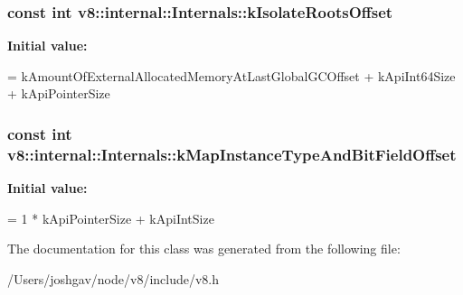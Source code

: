 \subsubsection[{\texorpdfstring{k\+Isolate\+Roots\+Offset}{kIsolateRootsOffset}}]{\setlength{\rightskip}{0pt plus 5cm}const int v8\+::internal\+::\+Internals\+::k\+Isolate\+Roots\+Offset\hspace{0.3cm}{\ttfamily [static]}}\hypertarget{classv8_1_1internal_1_1_internals_a3142f942a25203ce7fca0e9a4563c74d}{}\label{classv8_1_1internal_1_1_internals_a3142f942a25203ce7fca0e9a4563c74d}
{\bfseries Initial value\+:}
\begin{DoxyCode}
=
      kAmountOfExternalAllocatedMemoryAtLastGlobalGCOffset + kApiInt64Size +
      kApiPointerSize
\end{DoxyCode}
\subsubsection[{\texorpdfstring{k\+Map\+Instance\+Type\+And\+Bit\+Field\+Offset}{kMapInstanceTypeAndBitFieldOffset}}]{\setlength{\rightskip}{0pt plus 5cm}const int v8\+::internal\+::\+Internals\+::k\+Map\+Instance\+Type\+And\+Bit\+Field\+Offset\hspace{0.3cm}{\ttfamily [static]}}\hypertarget{classv8_1_1internal_1_1_internals_aeda3ec9bc2906bf6162b9cf3df9fd94a}{}\label{classv8_1_1internal_1_1_internals_aeda3ec9bc2906bf6162b9cf3df9fd94a}
{\bfseries Initial value\+:}
\begin{DoxyCode}
=
      1 * kApiPointerSize + kApiIntSize
\end{DoxyCode}


The documentation for this class was generated from the following file\+:\begin{DoxyCompactItemize}
\item 
/\+Users/joshgav/node/v8/include/v8.\+h\end{DoxyCompactItemize}
